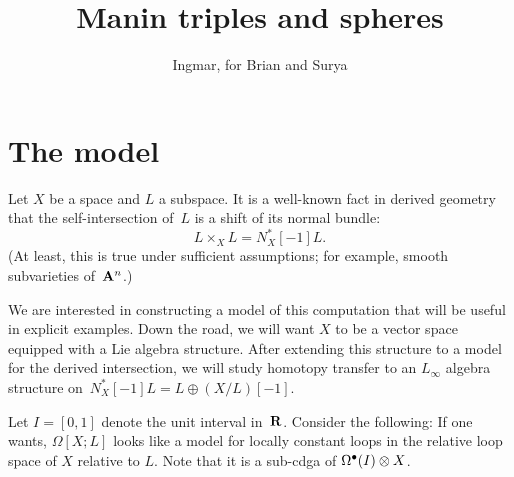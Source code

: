 \documentclass[12pt]{amsart}
\begin{document}

\title{Manin triples and spheres}
\author{Ingmar, for Brian and Surya}

\maketitle

\section{The model}

Let $X$ be a space and $L$ a subspace. It is a well-known fact in derived geometry that the self-intersection of~$L$ is a shift of its normal bundle:
\[
L \times_X L = N^*_X[-1] L.
\]
(At least, this is true under sufficient assumptions; for example, smooth subvarieties of~${\mathbf{A}}^n$.)

We are interested in constructing a model of this computation that will be useful in explicit examples. Down the road, we will want $X$ to be a vector space equipped with a Lie algebra structure. After extending this structure to a model for the derived intersection,  we will study homotopy transfer to an $L_\infty$ algebra structure on~$N^*_X[-1] L = L \oplus (X/L)[-1]$.

Let $I = [0,1]$ denote the unit interval in~$\mathbf{R}$. Consider the following:
If one wants, $\Omega[X;L]$ looks like a model for locally constant loops in the relative loop space of $X$ relative to $L$. Note that it is a sub-cdga of $\Omega^\bullet(I) \otimes X$.
\end{document}
